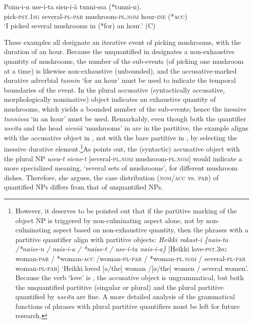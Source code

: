 \documentclass[output=paper]{LSP/langsci}
\begin{document}
\ea\label{15-hu-ex:43}
\gll Poim-i-n use-i-ta sien-i-ä tunni-ssa (*tunni-n).\\
pick-\textsc{pst}.\textsc{1sg} several-\textsc{pl}-\textsc{par} mushroom-\textsc{pl}.\textsc{nom} hour-\textsc{ine} (*\textsc{acc})\\
\glt ‘I picked several mushrooms in (*for) an hour.’  (C)
\z

These examples all designate an iterative event of picking mushrooms, with the duration of an hour. Because the unquantified  in  designates a non-exhaustive quantity of mushrooms, the number of the sub-events (of picking one mushroom at a time) is likewise non-exhaustive (unbounded), and the accusative-marked durative adverbial \textit{tunnin} ‘for an hour’ must be used to indicate the temporal boundaries of the event. In  the plural accusative (syntactically accusative, morphologically nominative) object indicates an exhaustive quantity of mushrooms, which yields a bounded number of the sub-events; hence the inessive \textit{tunnissa} ‘in an hour’ must be used. Remarkably, even though both the quantifier \textit{useita} and the head \textit{sieniä} ‘mushrooms’ in  are in the partitive, the example aligns with the accusative object in , not with the bare partitive in , by selecting the inessive durative element.\footnote{However, it deserves to be pointed out that if the partitive marking of the object NP is triggered by non-culminating aspect alone, not by non-culminating aspect based on non-exhaustive quantity, then the phrases with a partitive quantifier align with partitive objects: \textit{Heikki rakast-i \{nais-ta /*naise-n / nais-i-a / *naise-t / use-i-ta nais-i-a\}} [Heikki love-\textsc{pst}.\textsc{3sg} woman-\textsc{par} / *woman-\textsc{acc} /woman-\textsc{pl}-\textsc{par} / *woman-\textsc{pl}.\textsc{nom} / several-\textsc{pl}-\textsc{par} woman-\textsc{pl}-\textsc{par}] ‘Heikki loved [a/the] woman /[ø/the] women / several women’. Because the verb ‘love’ is , the accusative object is ungrammatical, but both the unquantified partitive (singular or plural) and the plural partitive quantified by \textit{useita} are fine. A more detailed analysis of the grammatical functions of phrases with plural partitive quantifiers must be left for future research.}As \citet{Yli-Vakkuri1979Partitiivisubjektin} points out, the (syntactic) accusative object with the plural NP \textit{usea}-\textit{t} \textit{siene}-\textit{t} [several-\textsc{pl}.\textsc{nom} mushroom-\textsc{pl}.\textsc{nom}] would indicate a more specialized meaning, \ie ‘several sets of mushrooms’, \eg for different mushroom dishes. Therefore, she argues, the case distribution (\textsc{nom}/\textsc{acc} vs. \textsc{par}) of quantified NPs differs from that of unquantified NPs. 
\end{document}
